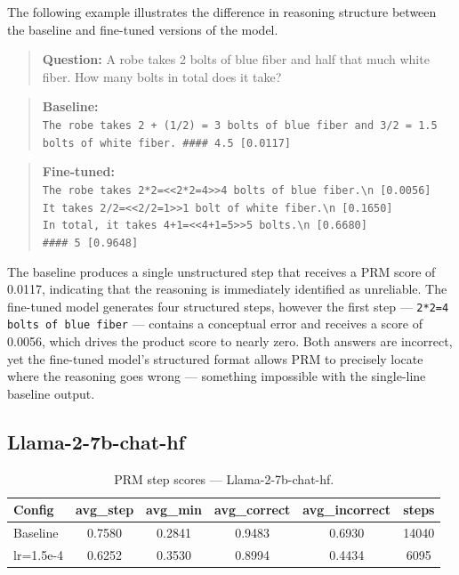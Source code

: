 The following example illustrates the difference
  in reasoning structure between the baseline and
  fine-tuned versions of the model.                                                       
  \begin{quote}
  \textbf{Question:} A robe takes 2 bolts of blue
  fiber and half that much white fiber. How many
  bolts in total does it take?
  \end{quote}

  \begin{quote}
  \textbf{Baseline:}\\
  \texttt{The robe takes 2 + (1/2) = 3 bolts of
  blue fiber and 3/2 = 1.5 bolts of white fiber. \#\#\#\# 4.5 [0.0117]}
  \end{quote}

  \begin{quote}
  \textbf{Fine-tuned:}\\
  \texttt{The robe takes 2*2=<<2*2=4>>4 bolts of
  blue fiber.\textbackslash n [0.0056]\\
  It takes 2/2=<<2/2=1>>1 bolt of white fiber.\textbackslash n [0.1650]\\
  In total, it takes 4+1=<<4+1=5>>5 bolts.\textbackslash n [0.6680]\\                     
  \#\#\#\# 5 [0.9648]}
  \end{quote}
  The
  baseline produces a single unstructured step that
  receives a PRM score of 0.0117, indicating that
  the reasoning is immediately identified as
  unreliable. The fine-tuned model generates four
  structured steps, however the first step
  --- \texttt{2*2=4 bolts of blue fiber} --- contains
  a conceptual error and receives a score of 0.0056,
  which drives the product score to nearly zero. Both answers are incorrect, yet the
  fine-tuned model's structured format allows PRM
  to precisely locate where the reasoning goes
  wrong --- something impossible with the single-line
  baseline output.

  \subsection{Llama-2-7b-chat-hf}

    \begin{table}[ht]
  \caption{PRM step scores --- Llama-2-7b-chat-hf.}
  \centering
  \footnotesize
  \begin{tabular}{lccccc}
  \toprule
  \textbf{Config} & \textbf{avg\_step} & \textbf{avg\_min} & \textbf{avg\_correct} & \textbf{avg\_incorrect} & \textbf{steps} \\
  \midrule
  Baseline        & 0.7580 & 0.2841 & 0.9483 & 0.6930 & 14040 \\
  lr=1.5e-4 & 0.6252 & 0.3530 & 0.8994 & 0.4434 & 6095 \\
  \bottomrule
  \end{tabular}

  \label{tab:prm-llama-chat-1}
  \end{table}

